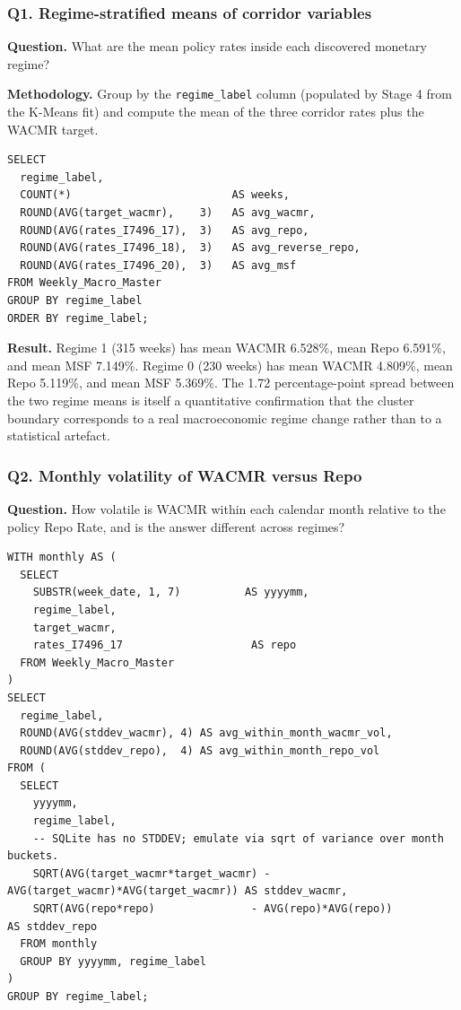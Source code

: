 \subsubsection*{Q1. Regime-stratified means of corridor variables}

\textbf{Question.} What are the mean policy rates inside each
discovered monetary regime?

\textbf{Methodology.} Group by the \texttt{regime\_label} column
(populated by Stage 4 from the K-Means fit) and compute the mean of
the three corridor rates plus the WACMR target.

\begin{lstlisting}[style=sql,caption={Q1, regime-stratified policy-rate means.}]
SELECT
  regime_label,
  COUNT(*)                         AS weeks,
  ROUND(AVG(target_wacmr),    3)   AS avg_wacmr,
  ROUND(AVG(rates_I7496_17),  3)   AS avg_repo,
  ROUND(AVG(rates_I7496_18),  3)   AS avg_reverse_repo,
  ROUND(AVG(rates_I7496_20),  3)   AS avg_msf
FROM Weekly_Macro_Master
GROUP BY regime_label
ORDER BY regime_label;
\end{lstlisting}

\textbf{Result.} Regime 1 (315 weeks) has mean WACMR 6.528\%, mean
Repo 6.591\%, and mean MSF 7.149\%. Regime 0 (230 weeks) has mean
WACMR 4.809\%, mean Repo 5.119\%, and mean MSF 5.369\%. The 1.72
percentage-point spread between the two regime means is itself a
quantitative confirmation that the cluster boundary corresponds to a
real macroeconomic regime change rather than to a statistical artefact.

\subsubsection*{Q2. Monthly volatility of WACMR versus Repo}

\textbf{Question.} How volatile is WACMR within each calendar month
relative to the policy Repo Rate, and is the answer different across
regimes?

\begin{lstlisting}[style=sql,caption={Q2, monthly within-period volatility.}]
WITH monthly AS (
  SELECT
    SUBSTR(week_date, 1, 7)          AS yyyymm,
    regime_label,
    target_wacmr,
    rates_I7496_17                    AS repo
  FROM Weekly_Macro_Master
)
SELECT
  regime_label,
  ROUND(AVG(stddev_wacmr), 4) AS avg_within_month_wacmr_vol,
  ROUND(AVG(stddev_repo),  4) AS avg_within_month_repo_vol
FROM (
  SELECT
    yyyymm,
    regime_label,
    -- SQLite has no STDDEV; emulate via sqrt of variance over month buckets.
    SQRT(AVG(target_wacmr*target_wacmr) - AVG(target_wacmr)*AVG(target_wacmr)) AS stddev_wacmr,
    SQRT(AVG(repo*repo)               - AVG(repo)*AVG(repo))                   AS stddev_repo
  FROM monthly
  GROUP BY yyyymm, regime_label
)
GROUP BY regime_label;
\end{lstlisting}

